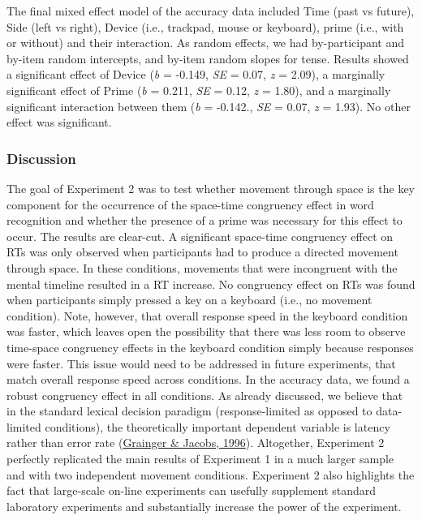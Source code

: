 \documentclass[
  a4paper,12pt,twoside,onecolumn,openright,final,oldfontcommands]{memoir}
\begin{document}
The final mixed effect model of the accuracy data included Time (past vs future), Side (left vs right), Device (i.e., trackpad, mouse or keyboard), prime (i.e., with or without) and their interaction. As random effects, we had by-participant and by-item random intercepts, and by-item random slopes for tense. Results showed a significant effect of Device (\emph{b} = -0.149, \emph{SE} = 0.07, \emph{z} = 2.09), a marginally significant effect of Prime (\emph{b} = 0.211, \emph{SE} = 0.12, \emph{z} = 1.80), and a marginally significant interaction between them (\emph{b} = -0.142., \emph{SE} = 0.07, \emph{z} = 1.93). No other effect was significant.

\hypertarget{discussion-1}{%
\subsubsection{Discussion}\label{discussion-1}}

The goal of Experiment 2 was to test whether movement through space is the key component for the occurrence of the space-time congruency effect in word recognition and whether the presence of a prime was necessary for this effect to occur. The results are clear-cut. A significant space-time congruency effect on RTs was only observed when participants had to produce a directed movement through space. In these conditions, movements that were incongruent with the mental timeline resulted in a RT increase. No congruency effect on RTs was found when participants simply pressed a key on a keyboard (i.e., no movement condition). Note, however, that overall response speed in the keyboard condition was faster, which leaves open the possibility that there was less room to observe time-space congruency effects in the keyboard condition simply because responses were faster. This issue would need to be addressed in future experiments, that match overall response speed across conditions. In the accuracy data, we found a robust congruency effect in all conditions. As already discussed, we believe that in the standard lexical decision paradigm (response-limited as opposed to data-limited conditions), the theoretically important dependent variable is latency rather than error rate (\protect\hyperlink{ref-grainger_orthographic_1996}{Grainger \& Jacobs, 1996}). Altogether, Experiment 2 perfectly replicated the main results of Experiment 1 in a much larger sample and with two independent movement conditions. Experiment 2 also highlights the fact that large-scale on-line experiments can usefully supplement standard laboratory experiments and substantially increase the power of the experiment.
\end{document}
